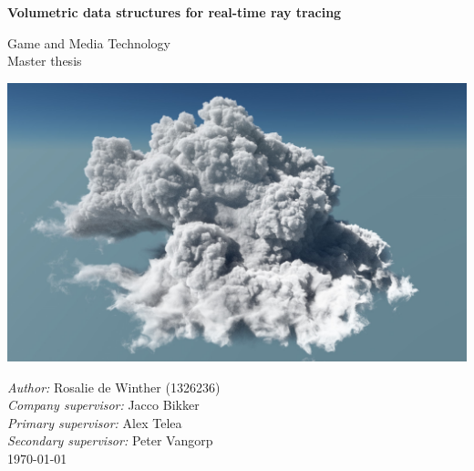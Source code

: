 \documentclass{article}
\title{}
\author{\textbf{Author}\\Rosalie de Winther (1326236)\\\\\textbf{Company supervisor}\\Jacco Bikker\\\\\textbf{Primary supervisor}\\Alex Telea\\\\\textbf{Secondary supervisor}\\Peter Vangorp}
\begin{document}
\begin{titlepage}
    \begin{center}
        \vspace*{1cm}

        \textbf{\huge Volumetric data structures for real-time ray tracing}

        \vspace{1cm}

        \large Game and Media Technology\\
        Master thesis


        \vspace{1cm}

        \includegraphics[width=\textwidth]{figures/disney _cloud.png}

        \vspace{1cm}



        \vspace{1cm}

        \raggedright \textit{Author:} Rosalie de Winther (1326236)\\
        \textit{Company supervisor:} Jacco Bikker\\
        \textit{Primary supervisor:} Alex Telea\\
        \textit{Secondary supervisor:} Peter Vangorp\\
        \today

    \end{center}
\end{titlepage}



\clearpage

\clearpage

\clearpage
\tableofcontents
\clearpage

\clearpage

\clearpage

\clearpage

\clearpage

\clearpage

\clearpage

\clearpage

\clearpage




\end{document}
